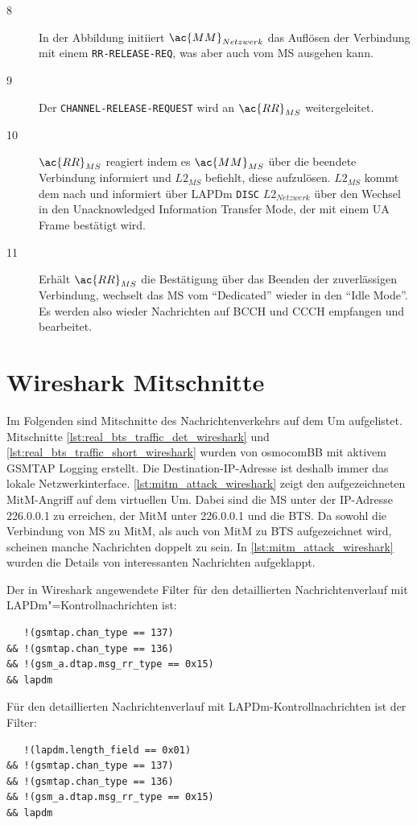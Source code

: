\begin{description}
\item[8] In der Abbildung initiiert $\ac{MM}_{Netzwerk}$ das Auflösen der Verbindung mit einem \texttt{RR-RELEASE-REQ}, was aber auch vom \ac{MS} ausgehen kann.
\item[9] Der \texttt{CHANNEL-RELEASE-REQUEST} wird an $\ac{RR}_{MS}$ weitergeleitet.
\item[10] $\ac{RR}_{MS}$ reagiert indem es $\ac{MM}_{MS}$ über die beendete Verbindung informiert und $L2_{MS}$ befiehlt, diese aufzulösen. $L2_{MS}$ kommt dem nach und informiert über \ac{LAPDm} \texttt{DISC} $L2_{Netzwerk}$ über den Wechsel in den Unacknowledged Information Transfer Mode, der mit einem \ac{UA} Frame bestätigt wird.
\item[11] Erhält $\ac{RR}_{MS}$ die Bestätigung über das Beenden der zuverlässigen Verbindung, wechselt das \ac{MS} vom "`Dedicated"' wieder in den "`Idle Mode"'. Es werden also wieder Nachrichten auf \ac{BCCH} und \ac{CCCH} empfangen und bearbeitet.  
\end{description} 

\section{Wireshark Mitschnitte}

Im Folgenden sind Mitschnitte des Nachrichtenverkehrs auf dem \ac{Um} aufgelistet. Mitschnitte \autoref{lst:real_bts_traffic_det_wireshark} und \autoref{lst:real_bts_traffic_short_wireshark} wurden von osmocomBB mit aktivem \ac{GSMTAP} Logging erstellt. Die Destination-\ac{IP}-Adresse ist deshalb immer das lokale Netzwerkinterface. \autoref{lst:mitm_attack_wireshark} zeigt den aufgezeichneten \ac{MitM}-Angriff auf dem virtuellen \ac{Um}. Dabei sind die \ac{MS} unter der \ac{IP}-Adresse 226.0.0.1 zu erreichen, der \ac{MitM} unter 226.0.0.1 und die \ac{BTS}. Da sowohl die Verbindung von \ac{MS} zu \ac{MitM}, als auch von \ac{MitM} zu \ac{BTS} aufgezeichnet wird, scheinen manche Nachrichten doppelt zu sein. In \autoref{lst:mitm_attack_wireshark} wurden die Details von interessanten Nachrichten aufgeklappt.

Der in Wireshark angewendete Filter für den detaillierten Nachrichtenverlauf mit \ac{LAPDm}"=Kontrollnachrichten ist: 
\begin{verbatim}
   !(gsmtap.chan_type == 137) 
&& !(gsmtap.chan_type == 136) 
&& !(gsm_a.dtap.msg_rr_type == 0x15) 
&& lapdm
\end{verbatim}
Für den detaillierten Nachrichtenverlauf mit \ac{LAPDm}-Kontrollnachrichten ist der Filter:
\begin{verbatim}
   !(lapdm.length_field == 0x01) 
&& !(gsmtap.chan_type == 137) 
&& !(gsmtap.chan_type == 136) 
&& !(gsm_a.dtap.msg_rr_type == 0x15) 
&& lapdm
\end{verbatim}

